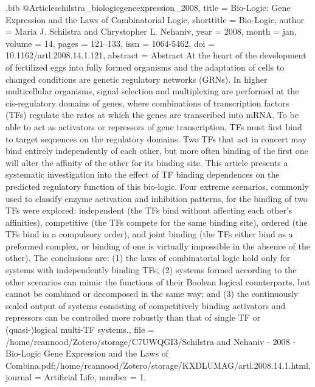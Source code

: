 \documentclass[
  table,
  10pt,
  a4paper]{article}
\begin{document}
\begin{filecontents}{\jobname.bib}
@Article{schilstra_biologicgeneexpression_2008,
	title = {Bio-{{Logic}}: {{Gene Expression}} and the {{Laws}} of {{Combinatorial Logic}}},
	shorttitle = {Bio-{{Logic}}},
	author = {Maria J. Schilstra and Chrystopher L. Nehaniv},
	year = {2008},
	month = {jan},
	volume = {14},
	pages = {121--133},
	issn = {1064-5462},
	doi = {10.1162/artl.2008.14.1.121},
	abstract = {Abstract At the heart of the development of fertilized eggs into fully formed organisms and the adaptation of cells to changed conditions are genetic regulatory networks (GRNs). In higher multicellular organisms, signal selection and multiplexing are performed at the cis-regulatory domains of genes, where combinations of transcription factors (TFs) regulate the rates at which the genes are transcribed into mRNA. To be able to act as activators or repressors of gene transcription, TFs must first bind to target sequences on the regulatory domains. Two TFs that act in concert may bind entirely independently of each other, but more often binding of the first one will alter the affinity of the other for its binding site. This article presents a systematic investigation into the effect of TF binding dependences on the predicted regulatory function of this bio-logic. Four extreme scenarios, commonly used to classify enzyme activation and inhibition patterns, for the binding of two TFs were explored: independent (the TFs bind without affecting each other's affinities), competitive (the TFs compete for the same binding site), ordered (the TFs bind in a compulsory order), and joint binding (the TFs either bind as a preformed complex, or binding of one is virtually impossible in the absence of the other). The conclusions are: (1) the laws of combinatorial logic hold only for systems with independently binding TFs; (2) systems formed according to the other scenarios can mimic the functions of their Boolean logical counterparts, but cannot be combined or decomposed in the same way; and (3) the continuously scaled output of systems consisting of competitively binding activators and repressors can be controlled more robustly than that of single TF or (quasi-)logical multi-TF systems.},
	file = {/home/rcannood/Zotero/storage/C7UWQGI3/Schilstra and Nehaniv - 2008 - Bio-Logic Gene Expression and the Laws of Combina.pdf;/home/rcannood/Zotero/storage/KXDLUMAG/artl.2008.14.1.html},
	journal = {Artificial Life},
	number = {1},
}


\end{filecontents}
\end{document}

